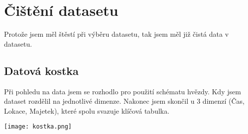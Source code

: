 \chapter{Čištění datasetu}
Protože jsem měl štěstí při výběru datasetu, tak jsem měl již čistá data v datasetu.

\section{Datová kostka}
Při pohledu na data jsem se rozhodlo pro použití schématu hvězdy. Kdy jsem dataset rozdělil na jednotlivé dimenze. Nakonec jsem skončil u 3 dimenzí (Čas, Lokace, Majetek), které spolu svazuje klíčová tabulka.

\vspace{1cm}

\texttt{[image: kostka.png]}

